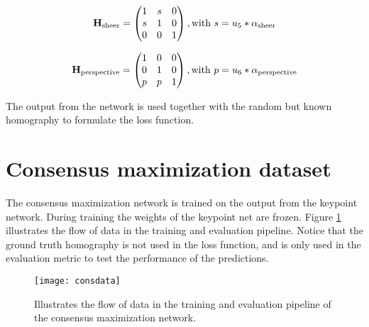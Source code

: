 \begin{equation}
\textbf{H}_{\mathrm{sheer}} = 
\begin{pmatrix}
1 & s & 0 \\
s & 1 & 0 \\
0 & 0 & 1 \\
\end{pmatrix}
, \text{with}
\ s=u_5*\alpha_{\mathrm{sheer}} \\
\end{equation}

\begin{equation}
\textbf{H}_{\mathrm{perspective}} = 
\begin{pmatrix}
1 & 0 & 0 \\
0 & 1 & 0 \\
p & p & 1 \\
\end{pmatrix}
, \text{with}
\ p=u_6*\alpha_{\mathrm{perspective}} \\
\end{equation}

The output from the network is used together with the random but known homography to formulate the loss function.

\section{Consensus maximization dataset}

The consensus maximization network is trained on the output from the keypoint network. During training the weights of the keypoint net are frozen. Figure \ref{fig:consdata} illustrates the flow of data in the training and evaluation pipeline. Notice that the ground truth homography is not used in the loss function, and is only used in the evaluation metric to test the performance of the predictions.

\begin{figure}[H]
	\centering
	\texttt{[image: consdata]}
	\caption{Illustrates the flow of data in the training and evaluation pipeline of the consensus maximization network.}
	\label{fig:consdata}
\end{figure}
